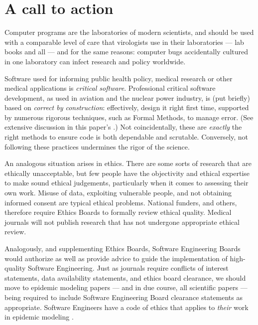 \documentclass{comjnl}
\begin{document}
\section{A call to action}\label{summary}
Computer programs are the laboratories of modern scientists, and should be used with a comparable level of care that virologists use in their laboratories --- lab books and all \cite{notebooks} --- and for the same reasons: computer bugs accidentally cultured in one laboratory can infect research and policy worldwide. 

Software used for informing public health policy, medical research or other medical applications is \emph{critical software}. Professional critical software development, as used in aviation and the nuclear power industry, is (put briefly) based on \emph{correct by construction}: \cite{cbc} effectively, design it right first time, supported by numerous rigorous techniques, such as Formal Methods, to manage error. (See extensive discussion in this paper's \supplement.) Not coincidentally, these are \emph{exactly\/} the right methods to ensure code is both dependable and scrutable. Conversely, not following these practices undermines the rigor of the science.

An analogous situation arises in ethics. There are some sorts of research that are ethically unacceptable, but few people have the objectivity and ethical expertise to make sound ethical judgements, particularly when it comes to assessing their own work. Misuse of data, exploiting vulnerable people, and not obtaining informed consent are typical ethical problems. National funders, and others, therefore require Ethics Boards to formally review ethical quality. Medical journals will not publish research that has not undergone appropriate ethical review. 

Analogously, and supplementing Ethics Boards, Software Engineering Boards would authorize as well as provide advice to guide the implementation of high-quality Software Engineering. Just as journals require conflicts of interest statements, data availability statements, and ethics board clearance, we should move to epidemic modeling papers --- and in due course, all scientific papers --- being required to include Software Engineering Board clearance statements as appropriate. {Software Engineers have a code of ethics that applies to \emph{their\/} work in epidemic modeling \cite{ethics-code}.}
\end{document}
